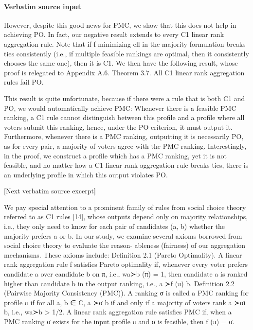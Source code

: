 \documentclass[10pt]{article}
\begin{document}
\paragraph{Verbatim source input}
\begin{ReviewVerbatim}
However, despite this good news for PMC, we show that this does not help in achieving PO. In fact,
our negative result extends to every C1 linear rank aggregation rule. Note that if f minimizing ell in
the majority formulation breaks ties consistently (i.e., if multiple feasible rankings are optimal, then
it consistently chooses the same one), then it is C1. We then have the following result, whose proof
is relegated to Appendix A.6.
Theorem 3.7. All C1 linear rank aggregation rules fail PO.

This result is quite unfortunate, because if there were a rule that is both C1 and PO, we would
automatically achieve PMC: Whenever there is a feasible PMC ranking, a C1 rule cannot distinguish
between this profile and a profile where all voters submit this ranking, hence, under the PO criterion,
it must output it. Furthermore, whenever there is a PMC ranking, outputting it is necessarily PO,
as for every pair, a majority of voters agree with the PMC ranking. Interestingly, in the proof, we
construct a profile which has a PMC ranking, yet it is not feasible, and no matter how a C1 linear
rank aggregation rule breaks ties, there is an underlying profile in which this output violates PO.

[Next verbatim source excerpt]

We pay special attention to a prominent family of rules from social choice theory referred to as C1
rules [14], whose outputs depend only on majority relationships, i.e., they only need to know for
each pair of candidates (a, b) whether the majority prefers a or b.
In our study, we examine several axioms borrowed from social choice theory to evaluate the reason-
ableness (fairness) of our aggregation mechanisms. These axioms include:
Definition 2.1 (Pareto Optimality). A linear rank aggregation rule f satisfies Pareto optimality if,
whenever every voter prefers candidate a over candidate b on π, i.e., wa≻b (π) = 1, then candidate
a is ranked higher than candidate b in the output ranking, i.e., a ≻f (π) b.
Definition 2.2 (Pairwise Majority Consistency (PMC)). A ranking σ is called a PMC ranking for
profile π if for all a, b ∈ C, a ≻σ b if and only if a majority of voters rank a ≻σi b, i.e., wa≻b > 1/2.
A linear rank aggregation rule satisfies PMC if, when a PMC ranking σ exists for the input profile
π and σ is feasible, then f (π) = σ.


\end{ReviewVerbatim}
\end{document}
